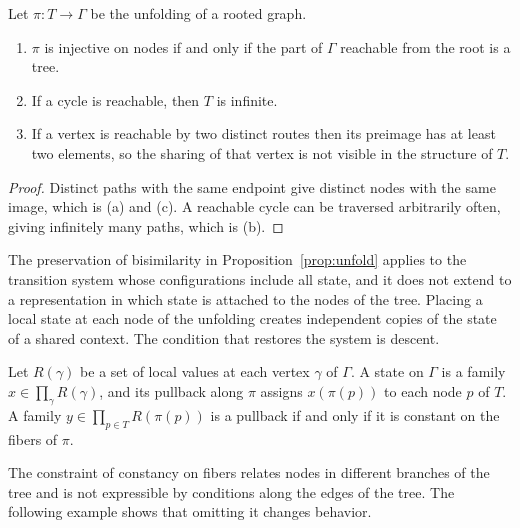 \begin{proposition}\label{prop:unfoldloss}
Let $\pi:T\to\Gamma$ be the unfolding of a rooted graph.
\begin{enumerate}[label=(\alph*)]
\item $\pi$ is injective on nodes if and only if the part of $\Gamma$ reachable from the root is a tree.
\item If a cycle is reachable, then $T$ is infinite.
\item If a vertex is reachable by two distinct routes then its preimage has at least two elements, so the sharing of that vertex is not visible in the structure of $T$.
\end{enumerate}
\end{proposition}
\begin{proof}
Distinct paths with the same endpoint give distinct nodes with the same image, which is (a) and (c). A reachable cycle can be traversed arbitrarily often, giving infinitely many paths, which is (b).
\end{proof}

The preservation of bisimilarity in Proposition~\ref{prop:unfold} applies to the transition system whose configurations include all state, and it does not extend to a representation in which state is attached to the nodes of the tree. Placing a local state at each node of the unfolding creates independent copies of the state of a shared context. The condition that restores the system is descent.

\begin{proposition}\label{prop:descent}
Let $R(\gamma)$ be a set of local values at each vertex $\gamma$ of $\Gamma$. A state on $\Gamma$ is a family $x\in\prod_\gamma R(\gamma)$, and its pullback along $\pi$ assigns $x(\pi(p))$ to each node $p$ of $T$. A family $y\in\prod_{p\in T}R(\pi(p))$ is a pullback if and only if it is constant on the fibers of $\pi$.
\end{proposition}

The constraint of constancy on fibers relates nodes in different branches of the tree and is not expressible by conditions along the edges of the tree. The following example shows that omitting it changes behavior.

